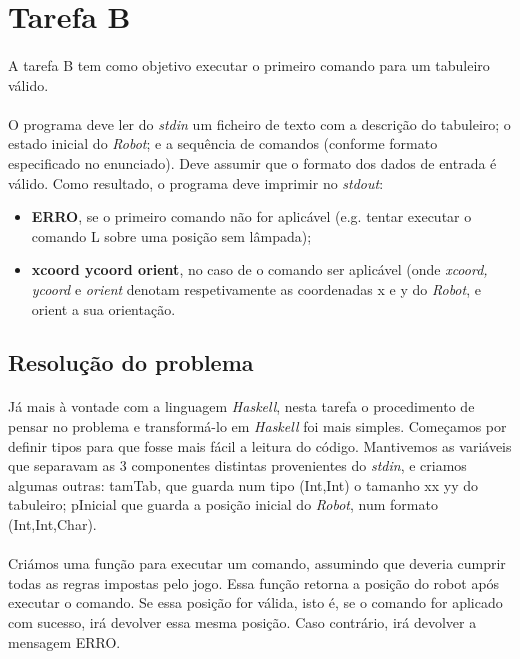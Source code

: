 \documentclass[a4paper,12pt]{article}
\begin{document}
\section{Tarefa B}

\paragraph{}
A tarefa B tem como objetivo executar o primeiro comando para um tabuleiro válido.
\paragraph{}
O programa deve ler do \emph{stdin} um ficheiro de texto com a descrição do tabuleiro; o estado inicial do \emph{Robot}; e a sequência de comandos (conforme formato especificado no enunciado). Deve assumir que o formato dos dados de entrada é válido. Como resultado, o programa deve imprimir no \emph{stdout}:
\begin{itemize}
\item \textbf{ERRO}, se o primeiro comando não for aplicável (e.g. tentar executar o comando L sobre uma posição sem lâmpada);

\item \textbf{xcoord ycoord orient}, no caso de o comando ser aplicável (onde \emph{xcoord, ycoord} e \emph{orient} denotam respetivamente as coordenadas x e y do \emph{Robot}, e orient a sua orientação.
\end{itemize}

\subsection{Resolução do problema}

\paragraph{}
Já mais à vontade com a linguagem \emph{Haskell}, nesta tarefa o procedimento de pensar no problema e transformá-lo em \emph{Haskell} foi mais simples. Começamos por definir tipos para que fosse mais fácil a leitura do código. Mantivemos as variáveis que separavam as 3 componentes distintas provenientes do \emph{stdin}, e criamos algumas outras: tamTab, que guarda num tipo (Int,Int) o tamanho xx yy do tabuleiro; pInicial que guarda a posição inicial do \emph{Robot}, num formato (Int,Int,Char).
\paragraph{}
Criámos uma função para executar um comando, assumindo que deveria cumprir todas as regras impostas pelo jogo. Essa função retorna a posição do robot após executar o comando. Se essa posição for válida, isto é, se o comando for aplicado com sucesso, irá devolver essa mesma posição. Caso contrário, irá devolver a mensagem ERRO.
\end{document}
